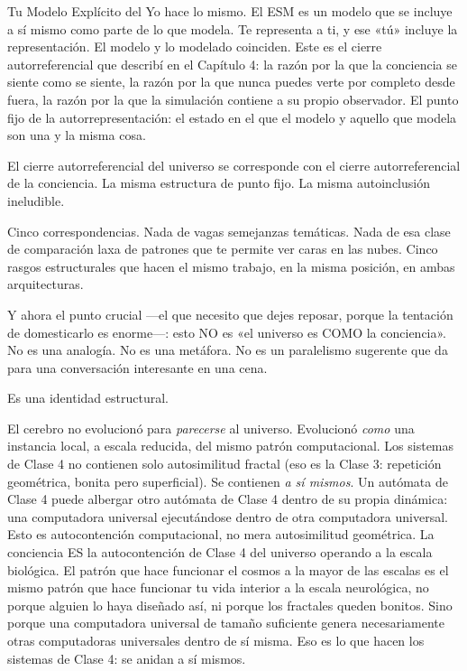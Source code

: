 \documentclass[11pt, twoside, openright]{book}
\begin{document}
Tu Modelo Explícito del Yo hace lo mismo. El ESM es un modelo que se incluye a sí mismo como parte de lo que modela. Te representa a ti, y ese «tú» incluye la representación. El modelo y lo modelado coinciden. Este es el cierre autorreferencial que describí en el Capítulo 4: la razón por la que la conciencia se siente como se siente, la razón por la que nunca puedes verte por completo desde fuera, la razón por la que la simulación contiene a su propio observador. El punto fijo de la autorrepresentación: el estado en el que el modelo y aquello que modela son una y la misma cosa.

El cierre autorreferencial del universo se corresponde con el cierre autorreferencial de la conciencia. La misma estructura de punto fijo. La misma autoinclusión ineludible.

Cinco correspondencias. Nada de vagas semejanzas temáticas. Nada de esa clase de comparación laxa de patrones que te permite ver caras en las nubes. Cinco rasgos estructurales que hacen el mismo trabajo, en la misma posición, en ambas arquitecturas.

Y ahora el punto crucial ---el que necesito que dejes reposar, porque la tentación de domesticarlo es enorme---: esto NO es «el universo es COMO la conciencia». No es una analogía. No es una metáfora. No es un paralelismo sugerente que da para una conversación interesante en una cena.

Es una identidad estructural.

El cerebro no evolucionó para \textit{parecerse} al universo. Evolucionó \textit{como} una instancia local, a escala reducida, del mismo patrón computacional. Los sistemas de Clase 4 no contienen solo autosimilitud fractal (eso es la Clase 3: repetición geométrica, bonita pero superficial). Se contienen \textit{a sí mismos}. Un autómata de Clase 4 puede albergar otro autómata de Clase 4 dentro de su propia dinámica: una computadora universal ejecutándose dentro de otra computadora universal. Esto es autocontención computacional, no mera autosimilitud geométrica. La conciencia ES la autocontención de Clase 4 del universo operando a la escala biológica. El patrón que hace funcionar el cosmos a la mayor de las escalas es el mismo patrón que hace funcionar tu vida interior a la escala neurológica, no porque alguien lo haya diseñado así, ni porque los fractales queden bonitos. Sino porque una computadora universal de tamaño suficiente genera necesariamente otras computadoras universales dentro de sí misma. Eso es lo que hacen los sistemas de Clase 4: se anidan a sí mismos.
\end{document}
